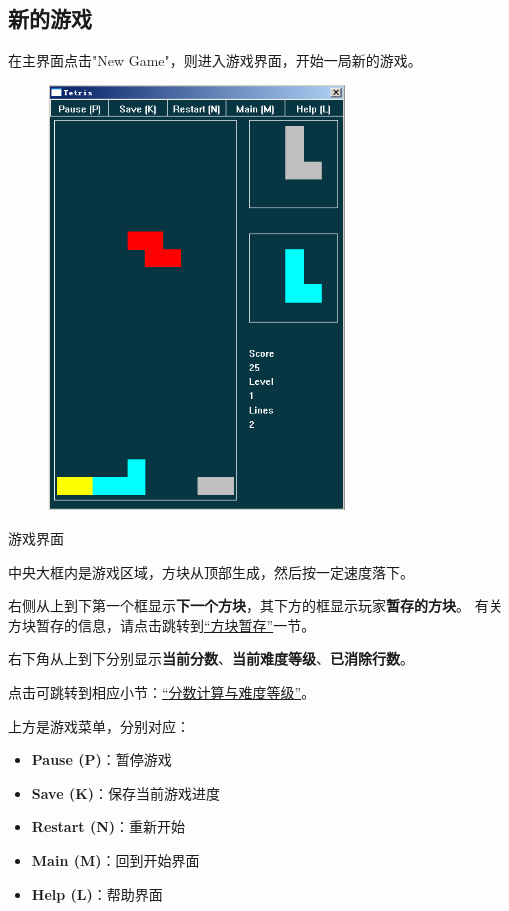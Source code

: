 \documentclass{style/ucasproposal}
\begin{document}
\subsection{新的游戏}

在主界面点击"New Game"，则进入游戏界面，开始一局新的游戏。
\begin{center}
\begin{figure}[H]
\center
    \includegraphics[width=0.7\textwidth]{./img/manual/2-play.png}
\end{figure}
游戏界面
\end{center}

中央大框内是游戏区域，方块从顶部生成，然后按一定速度落下。

右侧从上到下第一个框显示\textbf{下一个方块}，其下方的框显示玩家\textbf{暂存的方块}。
有关方块暂存的信息，请点击跳转到\hyperref[hold]{“方块暂存”}一节。

右下角从上到下分别显示\textbf{当前分数}、\textbf{当前难度等级}、\textbf{已消除行数}。

点击可跳转到相应小节：\hyperref[score]{“分数计算与难度等级”}。

上方是游戏菜单，分别对应：
\begin{itemize}
    \item \textbf{Pause (P)}：暂停游戏
    \item \textbf{Save (K)}：保存当前游戏进度
    \item \textbf{Restart (N)}：重新开始
    \item \textbf{Main (M)}：回到开始界面
    \item \textbf{Help (L)}：帮助界面
\end{itemize}
\end{document}
